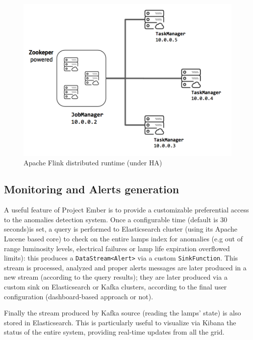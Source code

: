\begin{figure}[!b]
\begin{center}
	\includegraphics[scale=0.40]{img/ember_ha}
	\caption{Apache Flink distributed runtime (under HA)}
	\label{fig:ember_ha}
\end{center}
\end{figure}

\subsection*{Monitoring and Alerts generation}
A useful feature of Project Ember is to provide a customizable preferential access to the anomalies detection system. Once a configurable time (default is 30 seconds)is set, a query is performed to Elasticsearch cluster (using its Apache Lucene based core) to check on the entire lamps index for anomalies (e.g out of range luminosity levels, electrical failures or lamp life expiration overflowed limits): this produces a \texttt{DataStream<Alert>} via a custom \texttt{SinkFunction}. This stream is processed, analyzed and proper alerts messages are later produced in a new stream (according to the query results); they are later produced via a custom sink on Elasticsearch or Kafka clusters, according to the final user configuration (dashboard-based approach or not).

Finally the stream produced by Kafka source (reading the lamps' state) is also stored in Elasticsearch. This is particularly useful to visualize via Kibana the status of the entire system, providing real-time updates from all the grid. 


